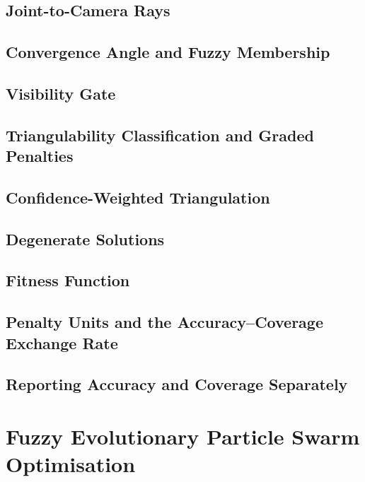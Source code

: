\subsection{Joint-to-Camera Rays}

\subsection{Convergence Angle and Fuzzy Membership}

\subsection{Visibility Gate}

\subsection{Triangulability Classification and Graded Penalties}

\subsection{Confidence-Weighted Triangulation}

\subsection{Degenerate Solutions}

\subsection{Fitness Function}

\subsection{Penalty Units and the Accuracy--Coverage Exchange Rate}

\subsection{Reporting Accuracy and Coverage Separately}

\section{Fuzzy Evolutionary Particle Swarm Optimisation}
\label{sec:fepso}

